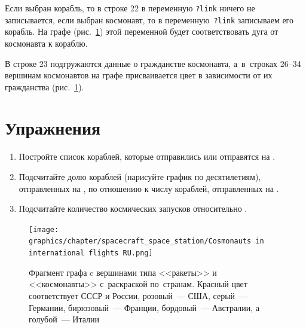 Если выбран корабль, то в строке 22 в переменную \lstinline|?link| ничего не записывается, 
если выбран космонавт, то в переменную~\lstinline|?link| записываем его корабль. 
На графе (рис.~\ref{fig:internationalFlights}) этой переменной будет соответствовать дуга от космонавта к кораблю. 

В строке 23 подгружаются данные о гражданстве космонавта, 
а~в~строках 26--34 вершинам космонавтов на графе присваивается цвет в зависимости от их гражданства (рис.~\ref{fig:internationalFlights}). 



\section{Упражнения}
\begin{enumerate}
  \item Постройте список кораблей, которые отправились или отправятся на .
  \item Подсчитайте долю кораблей (нарисуйте график по десятилетиям), 
        отправленных на , 
        по отношению к числу кораблей, отправленных на .
  \item Подсчитайте количество  космических запусков 
      относительно .%
\end{enumerate}



\begin{figure}[h]
\texttt{[image: graphics/chapter/spacecraft\_space\_station/Cosmonauts in international flights RU.png]}%
  \caption[Ракеты и космонавты на графе, 2022 год.]{Фрагмент графа c вершинами типа <<ракеты>> и <<космонавты>> с~раскраской по~странам. Красный цвет соответствует СССР и России, розовый~--- США, серый~--- Германии, бирюзовый~--- Франции, бордовый~--- Австралии, а голубой~--- Италии}
  \label{fig:internationalFlights}%
\end{figure}
